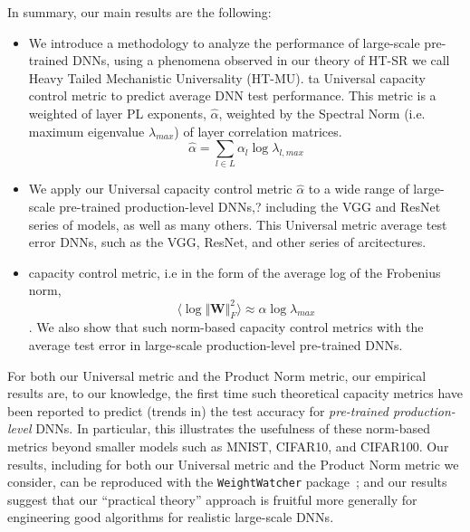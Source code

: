 In summary, our main results are the following:
\begin{itemize}
\item
We introduce a  methodology to analyze the performance of large-scale pre-trained DNNs,
using a phenomena observed in our theory of HT-SR we call Heavy Tailed Mechanistic Universality (HT-MU).
 ta Universal capacity control metric to predict average DNN test performance.
This metric is a weighted  of layer PL exponents, $\hat{\alpha}$, weighted by the Spectral Norm
(i.e. maximum eigenvalue $\lambda_{max}$) of layer correlation matrices. 
$$\hat{\alpha}=\sum_{l\in L}\alpha_{l}\log\lambda_{l,max}$$
\item
We apply our Universal capacity control metric $\hat{\alpha}$ to a wide range of large-scale pre-trained production-level DNNs,?
 including the VGG and ResNet series of models, as well as many others.
This Universal metric  average test error  DNNs,
such as the VGG, ResNet, and other series of arcitectures.
\item
{} capacity control metric, i.e
in the form of the average log of the Frobenius norm, 
$$\langle\log\Vert\mathbf{W}\Vert^{2}_{F}\rangle\approx \alpha\log\lambda_{max}$$.
We also show that
such norm-based capacity control metrics  with the average test error in large-scale production-level pre-trained DNNs.
\end{itemize}



For both our Universal metric and the Product Norm metric, our empirical results are, to our knowledge, the first time such theoretical capacity metrics have been reported to predict (trends in) the test accuracy for \emph{pre-trained production-level} DNNs.
In particular, this illustrates the usefulness of these norm-based metrics beyond smaller models such as MNIST, CIFAR10, and CIFAR100. 
Our 
results, including for both our Universal metric and the Product Norm metric we consider, can be reproduced with the \texttt{WeightWatcher} package~\cite{weightwatcher_pagkage}; and our
results suggest that our ``practical theory'' approach is fruitful more generally for engineering good algorithms for realistic large-scale DNNs.


